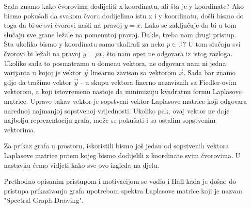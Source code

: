 \documentclass[11pt]{article}
\begin{document}
	Sada znamo kako čvorovima dodijeliti x koordinatu, ali šta je y koordinate? 
	Ako bismo pokušali da svakom čvoru dodijelimo istu x i y koordinatu, došli bismo do toga da bi se svi čvorovi našli na pravoj $y = x$.
	Lako se zaključuje da bi u tom slučaju sve grane ležale na pomenutoj pravoj. Dakle, treba nam drugi pristup. 
    Šta ukoliko bismo y koordinatu samo skalirali za neko $p \in \mathbb{R}$? U tom slučaju svi čvorovi bi ležali na pravoj $y=px$, što nam opet ne odgovara iz istog razloga.
    Ukoliko sada to posmatramo u domenu vektora, ne odgovara nam ni jedna varijanta u kojoj je vektor $\vec{y}$ linearno zavisan sa vektorom $\vec{x}$.
    Sada bar znamo gdje da tražimo vektor $\vec{y}$ - u skupu vektora linerno nezavisnih sa Fiedler-ovim vektorom, a koji istovremeno nastoje da minimizuju kvadratnu formu Laplasove matrice.
    Upravo takav vektor je sopstveni vektor Laplasove matrice koji odgovara narednoj najmanjoj sopstvenoj vrijednosti. 
	Ukoliko pak, ovaj vektor ne daje najbolju reprezentaciju grafa, može se pokušati i sa ostalim sopstvenim vektorima.

    Za prikaz grafa u prostoru, iskoristili bismo još jedan od sopstvenih vektora Laplasove matrice putem kojeg bismo dodijelili z koordinate svim čvorovima.
    U nastavku ćemo vidjeti kako sve ovo izgleda na djelu.

    Prethodno opisanim pristupom i motivacijom se vodio i Hall kada je došao do pristupa prikazivanju grafa upotrebom spektra Laplasove matrice koji je nazvan "Spectral Graph Drawing". 
\end{document}
